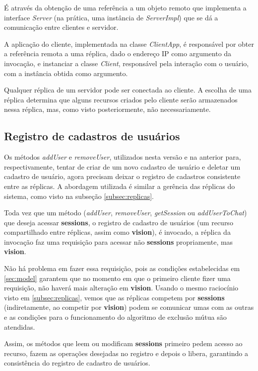 \documentclass[../main.tex]{subfiles}
\begin{document}
É através da obtenção de uma referência a um objeto remoto que implementa a interface \textit{Server} (na prática, uma instância de \textit{ServerImpl}) que se dá a comunicação entre clientes e servidor.

A aplicação do cliente, implementada na classe \textit{ClientApp}, é responsável por obter a referência remota a uma réplica, dado o endereço IP como argumento da invocação, e instanciar a classe \textit{Client}, responsável pela interação com o usuário, com a instância obtida como argumento.

Qualquer réplica de um servidor pode ser conectada ao cliente.
A escolha de uma réplica determina que alguns recursos criados pelo cliente serão armazenados nessa réplica, mas, como visto posteriormente, não necessariamente.

\subsection{Registro de cadastros de usuários}

Os métodos \textit{addUser} e \textit{removeUser}, utilizados nesta versão e na anterior para, respectivamente, tentar de criar de um novo cadastro de usuário e deletar um cadastro de usuário, agora precisam deixar o registro de cadastros consistente entre as réplicas.
A abordagem utilizada é similar a gerência das réplicas do sistema, como visto na subseção \ref{subsec:replicas}.

Toda vez que um método (\textit{addUser}, \textit{removeUser}, \textit{getSession} ou \textit{addUserToChat}) que deseja acessar \textbf{sessions}, o registro de cadastro de usuários (um recurso compartilhado entre réplicas, assim como \textbf{vision}), é invocado, a réplica da invocação faz uma requisição para acessar não \textbf{sessions} propriamente, mas \textbf{vision}.

Não há problema em fazer essa requisição, pois as condições estabelecidas em \ref{sec:model} garantem que no momento em que o primeiro cliente fizer uma requisição, não haverá mais alteração em \textbf{vision}.
Usando o mesmo raciocínio visto em \ref{subsec:replicas}, vemos que as réplicas competem por \textbf{sessions} (indiretamente, ao competir por \textbf{vision}) podem se comunicar umas com as outras e as condições para o funcionamento do algoritmo de exclusão mútua são atendidas.

Assim, os métodos que leem ou modificam \textbf{sessions} primeiro pedem acesso ao recurso, fazem as operações desejadas no registro e depois o libera, garantindo a consistência do registro de cadastro de usuários.
\end{document}
